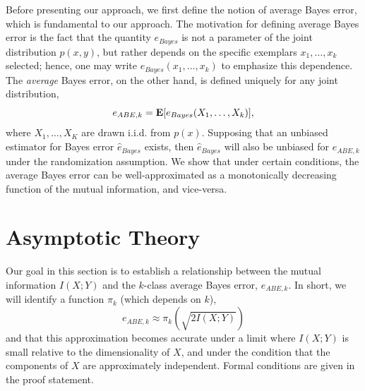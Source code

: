 \documentclass[12pt]{article}
\begin{document}
Before presenting our approach, we first define the notion of average
Bayes error, which is fundamental to our approach.  The motivation for
defining average Bayes error is the fact that the quantity $e_{Bayes}$
is not a parameter of the joint distribution $p(x, y)$, but rather
depends on the specific exemplars $x_1,\hdots, x_k$ selected; hence,
one may write $e_{Bayes}(x_1,\hdots, x_k)$ to emphasize this
dependence.  The \emph{average} Bayes error, on the other hand, is
defined uniquely for any joint distribution,
\begin{equation}\label{eq:abe}
e_{ABE, k} = \textbf{E}[e_{Bayes}(X_1,\hdots, X_k)],
\end{equation}
where $X_1,\hdots, X_K$ are drawn i.i.d. from $p(x)$.  Supposing that
an unbiased estimator for Bayes error $\hat{e}_{Bayes}$ exists, then
$\hat{e}_{Bayes}$ will also be unbiased for $e_{ABE, k}$ under the
randomization assumption.  We show that under certain conditions, the
average Bayes error can be well-approximated as a monotonically
decreasing function of the mutual information, and vice-versa.

\section{Asymptotic Theory}

Our goal in this section is to establish a relationship between the
mutual information $I(X; Y)$ and the $k$-class average Bayes error,
$e_{ABE, k}$.  In short, we will identify a function $\pi_k$
(which depends on $k$),
\[
e_{ABE, k} \approx \pi_k(\sqrt{2 I(X; Y)})
\]
and that this approximation becomes accurate under a limit where $I(X; Y)$ is small relative to the dimensionality of $X$,
and under the condition that the components of $X$ are approximately independent.  Formal conditions are given in the proof statement.
\end{document}
